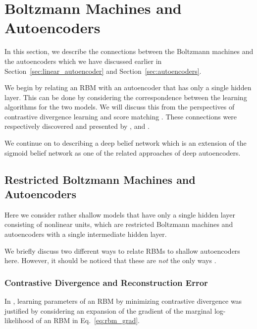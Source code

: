 \documentclass{now}
\begin{document}
\section{Boltzmann Machines and Autoencoders}
\label{sec:bm_aenc}

In this section, we describe the connections between
the Boltzmann machines and the autoencoders which we have
discussed earlier in Section~\ref{sec:linear_autoencoder}
and Section~\ref{sec:autoencoders}.

We begin by relating an RBM with an autoencoder that has
only a single hidden layer. This can be done by considering
the correspondence between the learning algorithms for the
two models. We will discuss this from the perspectives of contrastive
divergence learning and score matching
\citep{Hyvarinen2005}. These connections were respectively
discovered and presented by \citet{Bengio2009},
\citet{Swersky2011} and \citet{Vincent2011}.

We continue on to describing a deep belief network
\citep{Hinton2006nc} which is an extension of the sigmoid belief
network 
as one of
the related approaches of deep autoencoders. 

\subsection{Restricted Boltzmann Machines and Autoencoders}
\label{sec:rbm_aenc}

Here we consider rather shallow models that have only a
single hidden layer consisting of nonlinear units, which are
restricted Boltzmann machines and autoencoders with a single
intermediate hidden layer. 

We briefly discuss two different ways to relate RBMs to
shallow autoencoders here. However, it should be noticed
that these are \textit{not} the only ways \citep[see,
e.g.,][for another interpretation that unifies RBMs and
autoencoders]{Ranzato2007a}.

\subsubsection{Contrastive Divergence and Reconstruction Error}
\label{sec:cd_rerr}

In \citep{Bengio2009}, learning parameters of an RBM by
minimizing contrastive divergence was justified by
considering an expansion of the gradient of the marginal
log-likelihood of an RBM in Eq.~\eqref{eq:rbm_grad}. 
\end{document}
